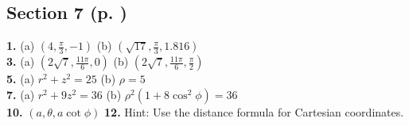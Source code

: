 \begin{multicols}{2}
\subsection*{Section 7 (p. \pageref{ssec1dot7})}
\textbf{1.} (a) $(4,\frac{\pi}{3},-1)$ \quad (b) $(\sqrt{17},\frac{\pi}{3},1.816)$\\\textbf{3.} (a)
$(2\sqrt{7},\frac{11\pi}{6},0)$ \quad (b) $(2\sqrt{7},\frac{11\pi}{6},\frac{\pi}{2})$\\\textbf{5.} (a) $r^2 + z^2 = 25$
\quad (b) $\rho = 5$\\\textbf{7.} (a) $r^2 + 9z^2 = 36$ \quad (b) $\rho^2 ( 1 + 8 \cos^2 \phi ) = 36$\\
\textbf{10.} $(a,\theta,a \cot \phi )$ \quad \textbf{12.} Hint: Use the distance formula for Cartesian coordinates.

\end{multicols}
